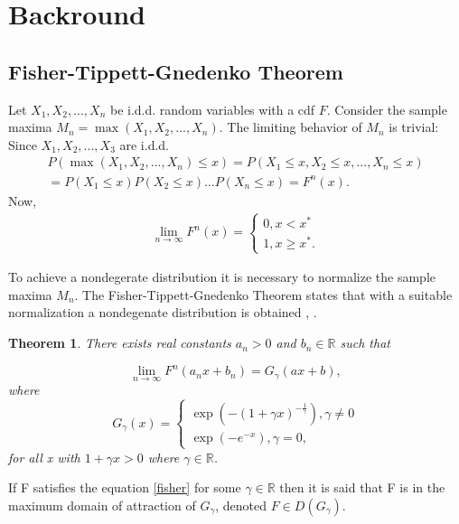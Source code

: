 \documentclass[english,12pt,a4paper,pdftex,sci,utf8]{aaltothesis} %
\newtheorem{theorem}{Theorem}[section]
\begin{document}
\thispagestyle{empty}




\clearpage

\section{Backround}
\label{backround}

\subsection{Fisher-Tippett-Gnedenko Theorem}
\label{domains}

Let $X_1, X_2, ..., X_n$ be i.d.d. random variables with a cdf $F$. Consider the  sample maxima $M_n = \max(X_1, X_2, ..., X_n)$. The limiting behavior of $M_n$ is trivial: Since $X_1, X_2,..., X_3$ are i.d.d.
\begin{gather*}
P(\max(X_1, X_2, ... , X_n) \leq x) = P(X_1 \leq x, X_2 \leq x,..., X_n \leq x) \\ = 
P(X_1 \leq x) P(X_2 \leq x) ... P(X_n \leq x)
=F^n(x).
\end{gather*}
Now,
\begin{gather*}
\lim_{n\to\infty} F^n(x) = 
\begin{cases}
0, x < x^* \\
1, x \geq x^*.
\end{cases}
\end{gather*}



To achieve a nondegerate distribution it is necessary to normalize the sample maxima $M_n$. The Fisher-Tippett-Gnedenko Theorem states that with a suitable normalization a nondegenate distribution is obtained \cite{fisher}, \cite{gnedenko}.

\begin{theorem}
There exists real constants $a_n>0$ and $b_n \in \mathbb{R}$ such that 

\begin{equation}
\lim_{n\to\infty} F^n(a_nx + b_n) = G_{\gamma}(ax+b),
\label{fisher}
\end{equation}
where
\begin{equation*}
G_{\gamma}(x)=
\begin{cases}
\exp(-(1 + \gamma x)^{-\frac{1}{\gamma}}), \gamma \neq 0 \\
\exp(-e^{-x}), \gamma = 0,
\end{cases}
\label{mdaEq}
\end{equation*}
for all x with $1+\gamma x > 0$ where $\gamma \in \mathbb{R}$.
\end{theorem}
If F satisfies the equation \eqref{fisher} for some $\gamma \in \mathbb{R}$ then it is said that F is in the maximum domain of attraction of $G_{\gamma}$, denoted $F \in D(G_{\gamma})$.
\end{document}
